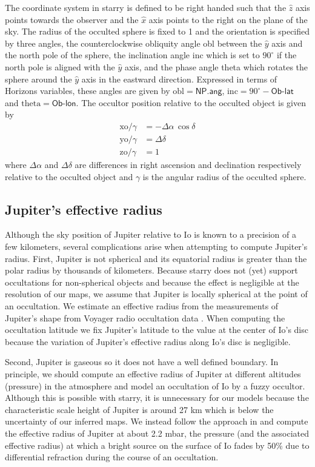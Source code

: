 \documentclass[modern]{aastex62}
\begin{document}
The coordinate system in \textsf{starry} is defined to be right handed such that the $\hat{z}$
axis points towards the observer and the $\hat{x}$ axis points to the right on the plane of the sky.
The radius of the occulted sphere is fixed to 1 and the orientation is specified by three angles,
the counterclockwise obliquity angle \textsf{obl} between the $\hat{y}$ axis and the north pole of the sphere, the inclination angle \textsf{inc} which is set to $90^\circ$ if the north pole is aligned with the $\hat{y}$ axis, and the phase angle \textsf{theta} which rotates the sphere around the $\hat{y}$ axis in the eastward direction.
Expressed in terms of Horizons variables, these angles are given by $\mathrm{obl}=\textsf{NP.ang}$, $\mathrm{inc}=90^\circ-\textsf{Ob-lat}$ and $\mathrm{theta}=\textsf{Ob-lon}$.
The occultor position relative to the occulted object is given by
\begin{align}
    \mathrm{xo}/\gamma&=-\Delta\alpha\,\cos\delta\\
    \mathrm{yo}/\gamma&=\Delta\delta\\
    \mathrm{zo}/\gamma&=1
\end{align}
where $\Delta\alpha$ and $\Delta\delta$ are differences in right ascension and declination respectively relative to the occulted object and $\gamma$ is the angular radius of the occulted sphere.

\subsection{Jupiter's effective radius}
\label{ssec:effective_radius}
Although the sky position of Jupiter relative to Io is known to a precision of a few kilometers, several complications arise when attempting to compute Jupiter's radius.
First, Jupiter is not spherical and its equatorial radius is greater than the polar radius by thousands of kilometers. 
Because \textsf{starry} does not (yet) support occultations for non-spherical objects and because the effect is negligible at the resolution of our maps, we assume that Jupiter is locally spherical at the point of an occultation. 
We estimate an effective radius from the measurements of Jupiter's shape from Voyager radio occultation data \citep[Fig.~7]{lindal1981}.
When computing the occultation latitude we fix Jupiter's latitude to the value at the center of Io's disc because 
the variation of Jupiter's effective radius along Io's disc is negligible.

Second, Jupiter is gaseous so it does not have a well defined boundary.
In principle, we should compute an effective radius of Jupiter at different altitudes (pressure) in the atmosphere and model an occultation of Io by a fuzzy occultor.
Although this is possible with \textsf{starry}, it is unnecessary for our models because the characteristic scale height of Jupiter is around 27 km  which is below the uncertainty of our inferred maps.
We instead follow the approach in \cite{spencer1990} and compute the effective radius of Jupiter at about 2.2 mbar, the pressure (and the associated effective radius) at which a  bright source on the surface of Io fades by 50\% due to differential refraction during the course of an occultation.
\end{document}
